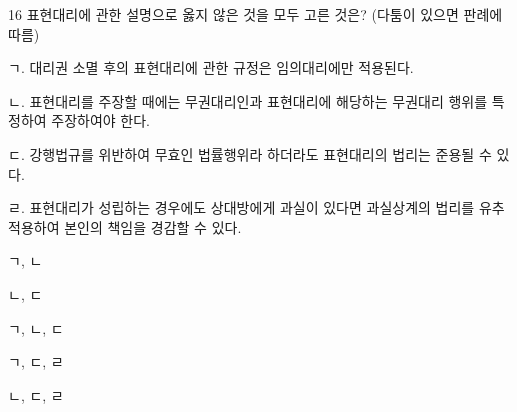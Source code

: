 \begin{question}{16}
표현대리에 관한 설명으로 옳지 않은 것을 모두 고른 것은? (다툼이 있으면 판례에 따름)
\begin{framedtext}
ㄱ. 대리권 소멸 후의 표현대리에 관한 규정은 임의대리에만 적용된다. \par
ㄴ. 표현대리를 주장할 때에는 무권대리인과 표현대리에 해당하는 무권대리 행위를 특정하여 주장하여야 한다. \par
ㄷ. 강행법규를 위반하여 무효인 법률행위라 하더라도 표현대리의 법리는 준용될 수 있다. \par
ㄹ. 표현대리가 성립하는 경우에도 상대방에게 과실이 있다면 과실상계의 법리를 유추적용하여 본인의 책임을 경감할 수 있다. \par
\end{framedtext}
\begin{choices}
  \item ㄱ, ㄴ
  \item ㄴ, ㄷ
  \item ㄱ, ㄴ, ㄷ
  \item ㄱ, ㄷ, ㄹ
  \item ㄴ, ㄷ, ㄹ
\end{choices}
\end{question}
